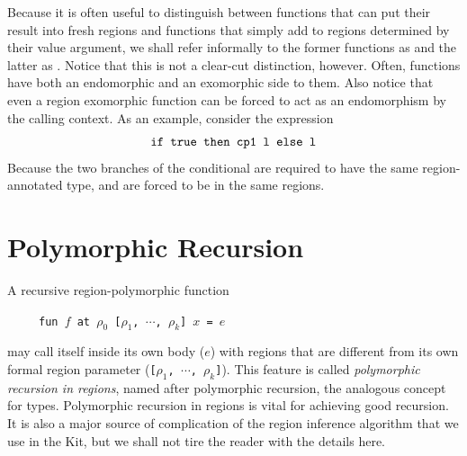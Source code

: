 \documentclass[12pt]{book}
\begin{document}
Because it is often useful to distinguish between functions that can
put their result into fresh regions and functions that simply add to
regions determined by their value argument, we shall refer informally
to the former functions as  and the latter as . Notice that this is not a clear-cut 
distinction, however. Often, functions have both an endomorphic and an
exomorphic side to them. Also notice that even a region exomorphic
function can be forced to act as an endomorphism by the calling
context. As an example, consider the expression
$$\hbox{\tt if true then cp1 l else l}$$
Because the two branches of the conditional are required to have the same region-annotated
type,  and  are forced to be in the same regions.
%
\section{Polymorphic Recursion}
%
\label{polyrec.sec}
A recursive region-polymorphic function
\begin{tabbing}
\ \ \ \ \ \=\tt fun $f$ at $\rho_0$ [$\rho_1$, $\cdots$, $\rho_k$] $x$ = $e$
\end{tabbing}
may call itself inside its own body ($e$) with regions that are different
from its own formal region parameter ({\tt [$\rho_1$, $\cdots$, $\rho_k$]}).
This feature is called {\it polymorphic recursion in regions}, named after
polymorphic recursion, the analogous concept for types.
Polymorphic recursion in regions is vital for achieving good recursion.
It is also a major source of  complication of the region inference algorithm
that we use in the Kit, but we shall not tire the reader with the details here.
\end{document}

